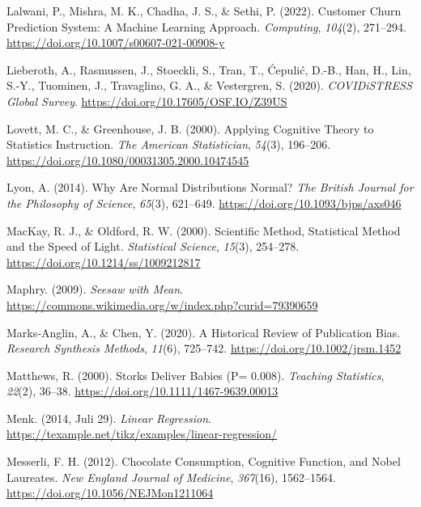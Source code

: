 \documentclass[
  letterpaper,
]{scrbook}
\newlength{\cslhangindent}
\newenvironment{CSLReferences}[2] %
 {\begin{list}{}{%
  \setlength{\itemindent}{0pt}
  \setlength{\leftmargin}{0pt}
  \setlength{\parsep}{0pt}
  \ifodd #1
   \setlength{\leftmargin}{\cslhangindent}
   \setlength{\itemindent}{-1\cslhangindent}
  \fi
  \setlength{\itemsep}{#2\baselineskip}}}
 {\end{list}}
\theoremstyle{definition}
\theoremstyle{definition}
\theoremstyle{definition}
\theoremstyle{remark}
\begin{document}
\begin{CSLReferences}{1}{0}
Lalwani, P., Mishra, M. K., Chadha, J. S., \& Sethi, P. (2022). Customer
Churn Prediction System: A Machine Learning Approach. \emph{Computing},
\emph{104}(2), 271--294.
\url{https://doi.org/10.1007/s00607-021-00908-y}

Lieberoth, A., Rasmussen, J., Stoeckli, S., Tran, T., Ćepulić, D.-B.,
Han, H., Lin, S.-Y., Tuominen, J., Travaglino, G. A., \& Vestergren, S.
(2020). \emph{{COVIDiSTRESS} Global Survey}.
\url{https://doi.org/10.17605/OSF.IO/Z39US}

Lovett, M. C., \& Greenhouse, J. B. (2000). Applying {Cognitive Theory}
to {Statistics Instruction}. \emph{The American Statistician},
\emph{54}(3), 196--206.
\url{https://doi.org/10.1080/00031305.2000.10474545}

Lyon, A. (2014). Why Are {Normal Distributions Normal}? \emph{The
British Journal for the Philosophy of Science}, \emph{65}(3), 621--649.
\url{https://doi.org/10.1093/bjps/axs046}

MacKay, R. J., \& Oldford, R. W. (2000). Scientific {Method},
{Statistical Method} and the {Speed} of {Light}. \emph{Statistical
Science}, \emph{15}(3), 254--278.
\url{https://doi.org/10.1214/ss/1009212817}

Maphry. (2009). \emph{Seesaw with Mean}.
\url{https://commons.wikimedia.org/w/index.php?curid=79390659}

Marks‐Anglin, A., \& Chen, Y. (2020). A Historical Review of Publication
Bias. \emph{Research Synthesis Methods}, \emph{11}(6), 725--742.
\url{https://doi.org/10.1002/jrsm.1452}

Matthews, R. (2000). Storks {Deliver Babies} (P= 0.008). \emph{Teaching
Statistics}, \emph{22}(2), 36--38.
\url{https://doi.org/10.1111/1467-9639.00013}

Menk. (2014, Juli 29). \emph{Linear Regression}.
\url{https://texample.net/tikz/examples/linear-regression/}

Messerli, F. H. (2012). Chocolate {Consumption}, {Cognitive Function},
and {Nobel Laureates}. \emph{New England Journal of Medicine},
\emph{367}(16), 1562--1564. \url{https://doi.org/10.1056/NEJMon1211064}


\end{CSLReferences}
\end{document}
